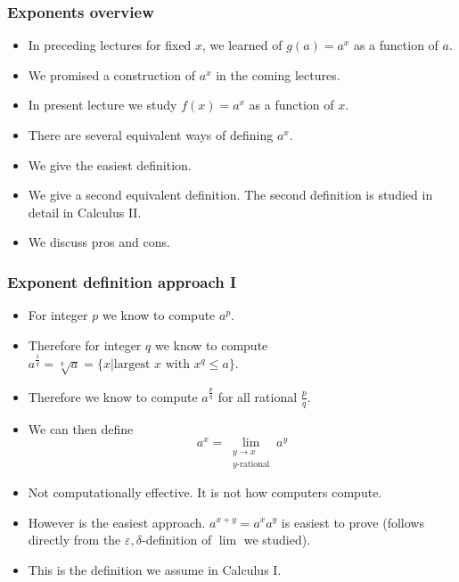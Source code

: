\begin{frame}
\frametitle{Exponents overview}
\begin{itemize}
\item<1-> In preceding lectures for fixed $x$, we learned of $g(a) =a^{x}$ as a function of $a$.
\item<2-> We promised a construction of $a^x$ in the coming lectures.
\item<3-> In present lecture we study $f(x)=a^x$ as a function of $x$.
\item<4-> There are several equivalent ways of defining $a^x$. 
\item<5-> We give the easiest definition. 
\item<6->We give a second equivalent definition. The second definition is studied in detail in Calculus II. 
\item<7->We discuss pros and cons.
\end{itemize}
\end{frame}
\begin{frame}
\frametitle{Exponent definition approach I}
\begin{itemize}
\item<1-> For integer $p$ we know to compute $a^p$.
\item<2-> Therefore for integer $q$ we know to compute $a^{\frac{1}{q}}= \sqrt[q]{a}=\{x|\text{largest~}x\text{~with~} x^q\leq a\}$.
\item<3-> Therefore we know to compute $a^{\frac{p}{q}}$ for all rational $\frac{p}{q}$.
\item<4-> We can then define
\[
a^x = \lim\limits_{\substack{y \to x \\ y\text{-rational}}} a^y 
\]
\item<5-> Not computationally effective. It is not how computers compute.
\item<6-> However is the easiest approach. $a^{x+y}=a^xa^y$ is easiest to prove (follows directly from the $\varepsilon, \delta$-definition of $\lim$ we studied).
\item<7->\alert<7->{This is the definition we assume in Calculus I.}
\end{itemize}
\end{frame}
